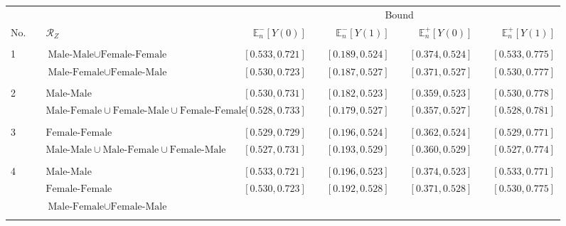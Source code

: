 \documentclass[10pt,a4paper,twoside]{article}
\numberwithin{equation}{section}
\begin{document}
\begin{sidewaystable}[p]
\centering
\caption{$\mathcal{R}_Z$ and admissible sets of values of $\mathbb{E}_n[Y(d)]$.}
\centering
\begin{subfigure}{\textwidth}
\centering
\begin{tabular}{lclcrcrcrcr}
\toprule
&	& &	& \multicolumn{7}{c}{Bound} \\
\cmidrule(r){4-11}	
No. & &	$\mathcal{R}_Z$	&	&	$\mathbb{E}_n^-[Y(0)]$	&	&	$\mathbb{E}_n^-[Y(1)]$	&	&	$\mathbb{E}_n^+[Y(0)]$	&	&	$\mathbb{E}_n^+[Y(1)]$\\
\midrule
& &\phantom{$\text{Male-Female}\cup\text{Female-Male}\cup\text{Female-Female}$}\\
1& & $\text{Male-Male}\cup\text{Female-Female}$	&	&	$[0.533,0.721]$	&	&	$[0.189,0.524]$	&	&	$[0.374,0.524]$	&	&	$[0.533,0.775]$
\\
& &$\text{Male-Female}\cup\text{Female-Male}$	&	&	\color{blue}$[0.530,0.723]$	&	&	\color{blue}$[0.187,0.527]$	&	&	\color{blue}$[0.371,0.527]$	&	&	\color{blue}$[0.530,0.777]$\\
\\
2 & &$\text{Male-Male}$	&	&	$[0.530,0.731]$	&	&	$[0.182,0.523]$	&	&	$[0.359,0.523]$	&	&	$[0.530,0.778]$
\\
& &$\text{Male-Female}\cup\text{Female-Male}\cup\text{Female-Female}$	&	&	\color{blue}$[0.528,0.733]$	&	&	\color{blue}$[0.179,0.527]$	&	&	\color{blue}$[0.357,0.527]$	&	&	\color{blue}$[0.528,0.781]$\\
\\
3 & &$\text{Female-Female}$	&	&	$[0.529,0.729]$	&	&	$[0.196,0.524]$	&	&	$[0.362,0.524]$	&	&	$[0.529,0.771]$
\\
& &$\text{Male-Male}\cup\text{Male-Female}\cup\text{Female-Male}$	& &\color{blue}$[0.527,0.731]$	&	&	\color{blue}$[0.193,0.529]$	&	&	\color{blue}$[0.360,0.529]$	&	&	\color{blue}$[0.527,0.774]$\\	
\\
4 & &$\text{Male-Male}$&	&	$[0.533,0.721]$	&	&	$[0.196,0.523]$	&	&	$[0.374,0.523]$	&	&	$[0.533,0.771]$
\\
& &$\text{Female-Female}$ & &\color{blue}$[0.530,0.723]$	&	&	\color{blue}$[0.192,0.528]$	&	&	\color{blue}$[0.371,0.528]$	&	&	\color{blue}$[0.530,0.775]$\\
& &$\text{Male-Female}\cup\text{Female-Male}$\\	
\\

\end{tabular}
\end{subfigure}
\end{sidewaystable}
\end{document}
